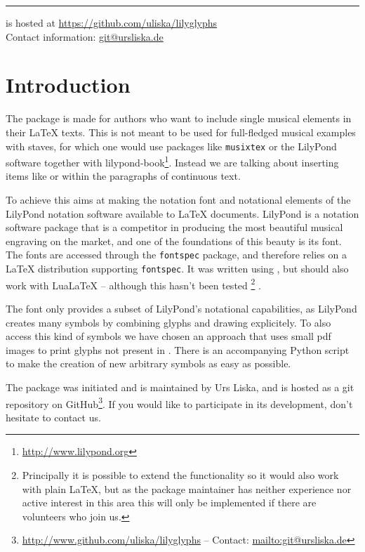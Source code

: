 \documentclass{article}
\begin{document}
\hrule
\bigskip
\noindent
\lilyglyphs{} is hosted at \url{https://github.com/uliska/lilyglyphs}\\
Contact information: \href{mailto:git@ursliska.de}{git@ursliska.de}
\pagebreak

\tableofcontents

\pagebreak
\section{Introduction}
\label{sec:introduction}
The package \lilyglyphs is made for authors who want to include single musical elements in their \LaTeX{} texts. 
This is not meant to be used for full-fledged musical examples with staves, for which one would use packages like \texttt{musixtex} or the LilyPond software together with lilypond-book\footnote{\url{http://www.lilypond.org}}. 
Instead we are talking about inserting items like \quaver or \lilyRFZ within the paragraphs of continuous text.

To achieve this \lilyglyphs aims at making the notation font and notational elements of the LilyPond notation software available to \LaTeX{} documents.
LilyPond is a notation software package that is a competitor in producing the most beautiful musical engraving on the market, and one of the foundations of this beauty is its \emmentaler font.
The \emmentaler fonts are accessed through the \texttt{fontspec} package, and \lilyglyphs therefore relies on a \LaTeX{} distribution supporting \texttt{fontspec}. 
It was written using \XeLaTeX, but should also work with LuaLaTeX -- although this hasn't been tested%
\footnote{Principally it is possible to extend the functionality so it would also work with plain \LaTeX, but as the package maintainer has neither experience nor active interest in this area this will only be implemented if there are volunteers who join us.}%
.

The \emmentaler font only provides a subset of LilyPond's notational capabilities, as LilyPond creates many symbols by combining glyphs and drawing explicitely.
To also access this kind of symbols we have chosen an approach that uses small pdf images to print glyphs not present in \emmentaler.
There is an accompanying Python script to make the creation of new arbitrary symbols as easy as possible.

The \lilyglyphs package was initiated and is maintained by Urs Liska, and is hosted as a git repository on GitHub\footnote{\url{http://www.github.com/uliska/lilyglyphs} -- Contact: \url{mailto:git@ursliska.de}}.
If you would like to participate in its development, don't hesitate to contact us.
\end{document}
